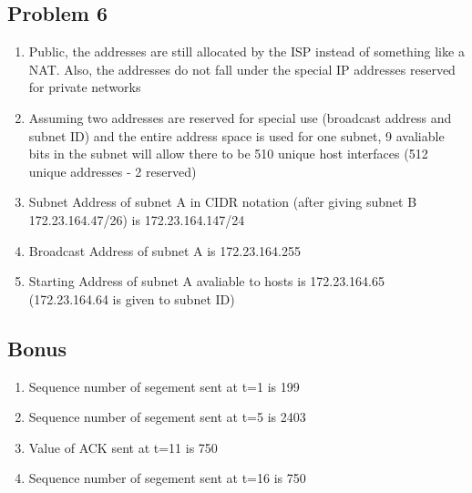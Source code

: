 \documentclass[14pt]{article}
\begin{document}
\pagebreak

\subsection*{Problem 6}
\begin{enumerate}
\item Public, the addresses are still allocated by the ISP instead of something like a NAT. Also, the addresses do not fall under the special IP addresses reserved for private networks
\item Assuming two addresses are reserved for special use (broadcast address and subnet ID) and the entire address space is used for one subnet, 9 avaliable bits in the subnet will allow there to be 510 unique host interfaces (512 unique addresses - 2 reserved)
\item Subnet Address of subnet A in CIDR notation (after giving subnet B 172.23.164.47/26) is 172.23.164.147/24
\item Broadcast Address of subnet A is 172.23.164.255
\item Starting Address of subnet A avaliable to hosts is 172.23.164.65 (172.23.164.64 is given to subnet ID)
\end{enumerate}

\subsection*{Bonus}
\begin{enumerate}
\item Sequence number of segement sent at t=1 is 199
\item Sequence number of segement sent at t=5 is 2403
\item Value of ACK sent at t=11 is 750
\item Sequence number of segement sent at t=16 is 750
\end{enumerate}
\end{document}
